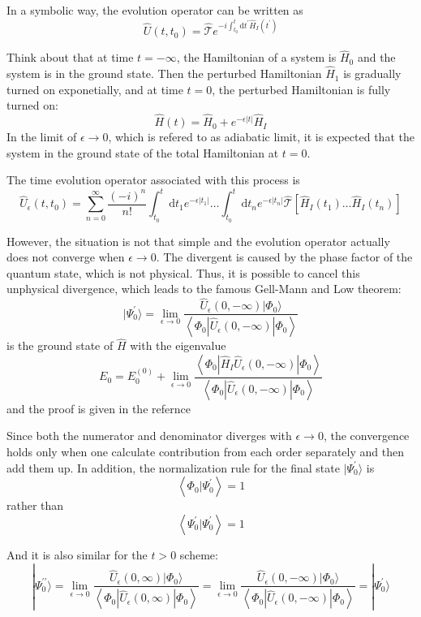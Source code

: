 \documentclass[bachelor, english]{ustcthesis}
\begin{document}
In a symbolic way, the evolution operator can be written as
$$
\hat{U}\left(t, t_{0}\right)=\hat{\mathcal{T}} e^{-i \int_{t_{0}}^{t} \mathrm{d} t^{\prime} \hat{H}_{I}\left(t^{\prime}\right)}
$$

Think about that at time $t=-\infty$, the Hamiltonian of a system is $\hat{H}_0$ and the system is in the ground state.
Then the perturbed Hamiltonian $\hat{H}_1$ is gradually turned on exponetially, and at time $t=0$, the perturbed Hamiltonian is fully turned on:
$$
\hat{H}(t)=\hat{H}_{0}+e^{-\epsilon|t|} \hat{H}_{I}
$$
In the limit of $\epsilon \rightarrow 0$, which is refered to as adiabatic limit, it is expected that the system in the ground state of the total Hamiltonian at $t=0$.

The time evolution operator associated with this process is
$$
\hat{U}_{\epsilon}\left(t, t_{0}\right)=\sum_{n=0}^{\infty} \frac{(-i)^{n}}{n !} \int_{t_{0}}^{t} \mathrm{d} t_{1} e^{-\epsilon\left|t_{1}\right|} \ldots \int_{t_{0}}^{t} \mathrm{d} t_{n} e^{-\epsilon\left|t_{n}\right|} \hat{\mathcal{T}}\left[\hat{H}_{I}\left(t_{1}\right) \ldots \hat{H}_{I}\left(t_{n}\right)\right]
$$

However, the situation is not that simple and the evolution operator actually does not converge when $\epsilon \rightarrow 0$.
The divergent is caused by the phase factor of the quantum state, which is not physical.
Thus, it is possible to cancel this unphysical divergence, which leads to the famous Gell-Mann and Low theorem:
$$
| \Psi_{0}^{\prime} \rangle=\lim _{\epsilon \rightarrow 0} \frac{\hat{U}_{\epsilon}(0,-\infty) | \Phi_{0} \rangle}{\left\langle\Phi_{0}\left|\hat{U}_{\epsilon}(0,-\infty)\right| \Phi_{0}\right\rangle}
$$
is the ground state of $\hat{H}$ with the eigenvalue
$$
E_{0}=E_{0}^{(0)}+\lim _{\epsilon \rightarrow 0} \frac{\left\langle\Phi_{0}\left|\hat{H}_{I} \hat{U}_{\epsilon}(0,-\infty)\right| \Phi_{0}\right\rangle}{\left\langle\Phi_{0}\left|\hat{U}_{\epsilon}(0,-\infty)\right| \Phi_{0}\right\rangle}
$$
and the proof is given in the refernce \cite{gallmannlow}

Since both the numerator and denominator diverges with $\epsilon \rightarrow 0$, the convergence holds only when one calculate contribution from each order separately and then add them up.
In addition, the normalization rule for the final state $| \Psi_{0}^{\prime}\rangle$ is 
$$
\left\langle\Phi_{0} | \Psi_{0}^{\prime}\right\rangle= 1
$$
rather than
$$
\left\langle\Psi_{0}^{\prime} | \Psi_{0}^{\prime}\right\rangle= 1
$$

And it is also similar for the $t>0$ scheme:
$$
| \Psi_{0}^{\prime \prime} \rangle=\lim _{\epsilon \rightarrow 0} \frac{\hat{U}_{\epsilon}(0, \infty) | \Phi_{0} \rangle}{\left\langle\Phi_{0}\left|\hat{U}_{\epsilon}(0, \infty)\right| \Phi_{0}\right\rangle}=\lim _{\epsilon \rightarrow 0} \frac{\hat{U}_{\epsilon}(0,-\infty) | \Phi_{0} \rangle}{\left\langle\Phi_{0}\left|\hat{U}_{\epsilon}(0,-\infty)\right| \Phi_{0}\right\rangle}=| \Psi_{0}^{\prime} \rangle
$$
\end{document}
